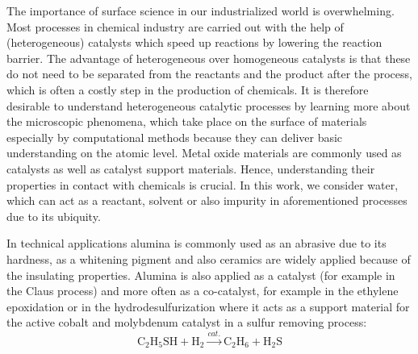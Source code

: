 \documentclass[11pt,DIV=13,BCOR=5mm,a4paper,headinclude]{scrbook}
\begin{document}
\renewcommand{\contentsname}{Contents}
\clearpage
\tableofcontents
\clearpage


The importance of surface science in our industrialized world is overwhelming.
Most processes in chemical industry are carried out with the help of (heterogeneous) catalysts\cite{Ago2005,Cargnello2012,Knozinger1978} which speed up reactions by lowering the reaction barrier.
The advantage of heterogeneous over homogeneous catalysts is that these do not need to be separated from the reactants and the product after the process, which is often a costly step in the production of chemicals.
It is therefore desirable to understand heterogeneous catalytic processes by learning more about the microscopic phenomena, which take place on the surface of materials especially by computational methods because they can deliver basic understanding on the atomic level.
Metal oxide materials are commonly used as catalysts as well as catalyst support materials.
Hence, understanding their properties in contact with chemicals is crucial.
In this work, we consider water, which can act as a reactant, solvent or also impurity in aforementioned processes due to its ubiquity.


In technical applications alumina is commonly used as an abrasive due to its hardness, as a whitening pigment and also ceramics are widely applied because of the insulating properties.
Alumina is also applied as a catalyst (for example in the Claus process\cite{Pearson1977}) %
and more often as a co-catalyst, for example in the ethylene epoxidation\cite{Oezbek2013} or in the hydrodesulfurization\cite{Parijs1986} where it acts as a support material for the active cobalt and molybdenum catalyst in a sulfur removing process:
\begin{equation*}
 \textrm{C}_2\textrm{H}_5\textrm{SH} + \textrm{H}_2  \xrightarrow{cat.} \textrm{C}_2\textrm{H}_6 + \textrm{H}_2\textrm{S}
\end{equation*}
\end{document}
